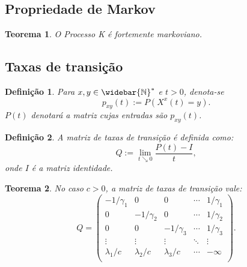 \documentclass[xcolor=pdftex,dvipsnames]{beamer}
\newcommand{\Nzb}{{\mathbb{\widebar{N}^*}}}
\newtheorem{teorema}{Teorema}
\newtheorem{definicao}{Definição}
\begin{document}
\subsection{Propriedade de Markov}

\begin{frame}
  \begin{teorema}
    O Processo K é fortemente markoviano.
  \end{teorema}
\end{frame}


\subsection{Taxas de transição}

\begin{frame}
  \begin{definicao}
    Para $x, y \in \Nzb$ e $t > 0$, denota-se
    \begin{displaymath}
      p_{x y} (t) := P \left( X^x(t) = y \right).
    \end{displaymath}
    $P (t)$ denotará a matriz cujas entradas são $p_{x y} (t)$.
  \end{definicao} \pause
  \begin{definicao}
    A matriz de taxas de transição é definida como:
    \begin{displaymath}
      Q := \lim_{t \searrow 0} \frac{P(t) - I}{t},
    \end{displaymath}
    onde $I$ é a matriz identidade.
  \end{definicao}
\end{frame}

\begin{frame}
  \begin{teorema}
    No caso $c > 0$, a matriz de taxas de transição vale:
    \begin{displaymath}
      Q = \left(
        \begin{array}{ccccc}
          -1/\gamma_1 & 0 & 0 & \cdots & 1/\gamma_1\\
          0 & -1/\gamma_2 & 0 & \cdots & 1/\gamma_2\\
          0 & 0 & -1/\gamma_3 & \cdots & 1/\gamma_3\\
          \vdots & \vdots & \vdots & \ddots & \vdots \\
          \lambda_1/c & \lambda_2/c &
          \lambda_3/c & \cdots & -\infty\\
        \end{array}
      \right).
    \end{displaymath}
  \end{teorema}
\end{frame}
\end{document}
